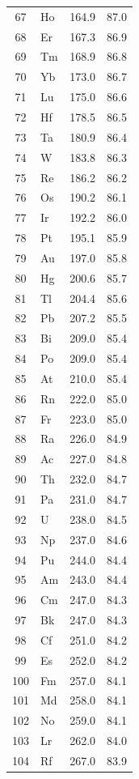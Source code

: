 \documentclass[12pt,a4paper]{article}
\begin{document}
\begin{longtable}{c l c c}
		67 & Ho  & 164.9  & 87.0 \\
		68 & Er  & 167.3  & 86.9 \\
		69 & Tm  & 168.9  & 86.8 \\
		70 & Yb  & 173.0  & 86.7 \\
		71 & Lu  & 175.0  & 86.6 \\
		72 & Hf  & 178.5  & 86.5 \\
		73 & Ta  & 180.9  & 86.4 \\
		74 & W   & 183.8  & 86.3 \\
		75 & Re  & 186.2  & 86.2 \\
		76 & Os  & 190.2  & 86.1 \\
		77 & Ir  & 192.2  & 86.0 \\
		78 & Pt  & 195.1  & 85.9 \\
		79 & Au  & 197.0  & 85.8 \\
		80 & Hg  & 200.6  & 85.7 \\
		81 & Tl  & 204.4  & 85.6 \\
		82 & Pb  & 207.2  & 85.5 \\
		83 & Bi  & 209.0  & 85.4 \\
		84 & Po  & 209.0  & 85.4 \\
		85 & At  & 210.0  & 85.4 \\
		86 & Rn  & 222.0  & 85.0 \\
		87 & Fr  & 223.0  & 85.0 \\
		88 & Ra  & 226.0  & 84.9 \\
		89 & Ac  & 227.0  & 84.8 \\
		90 & Th  & 232.0  & 84.7 \\
		91 & Pa  & 231.0  & 84.7 \\
		92 & U   & 238.0  & 84.5 \\
		93 & Np  & 237.0  & 84.6 \\
		94 & Pu  & 244.0  & 84.4 \\
		95 & Am  & 243.0  & 84.4 \\
		96 & Cm  & 247.0  & 84.3 \\
		97 & Bk  & 247.0  & 84.3 \\
		98 & Cf  & 251.0  & 84.2 \\
		99 & Es  & 252.0  & 84.2 \\
		100& Fm  & 257.0  & 84.1 \\
		101& Md  & 258.0  & 84.1 \\
		102& No  & 259.0  & 84.1 \\
		103& Lr  & 262.0  & 84.0 \\
		104& Rf  & 267.0  & 83.9 \\

\end{longtable}
\end{document}
